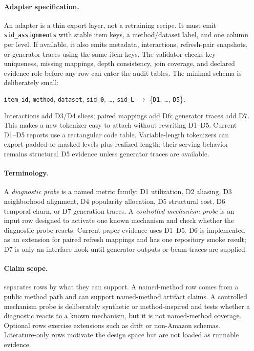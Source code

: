 \paragraph{Adapter specification.}
An adapter is a thin export layer, not a retraining recipe. It must emit
\texttt{sid\_assignments} with stable item keys, a method/dataset label, and
one column per \sid level. If available, it also emits metadata, interactions,
refresh-pair snapshots, or generator traces using the same item keys. The
validator checks key uniqueness, missing mappings, depth consistency, join
coverage, and declared evidence role before any row can enter the audit tables.
The minimal schema is deliberately small:
\begin{center}
\small
\texttt{item\_id}, \texttt{method}, \texttt{dataset}, \texttt{sid\_0}, \ldots,
\texttt{sid\_L} $\rightarrow$ \{\texttt{D1}, \ldots, \texttt{D5}\}.
\end{center}
Interactions add D3/D4 slices; paired mappings add D6; generator traces add
D7. This makes a new tokenizer easy to attach without rewriting D1--D5.
Current D1--D5 reports use a rectangular code table. Variable-length tokenizers
can export padded or masked levels plus realized length; their serving behavior
remains structural D5 evidence unless generator traces are available.

\paragraph{Terminology.}
A \emph{diagnostic probe} is a named metric family: D1 utilization, D2
aliasing, D3 neighborhood alignment, D4 popularity allocation, D5 structural
cost, D6 temporal churn, or D7 generation traces. A \emph{controlled mechanism
probe} is an input row designed to activate one known mechanism and check
whether the diagnostic probe reacts. Current paper evidence uses D1--D5. D6 is
implemented as an extension for paired refresh mappings and has one repository
smoke result; D7 is only an interface hook until generator outputs or beam
traces are supplied.

\paragraph{Claim scope.}
\tool separates rows by what they can support. A named-method row comes from a
public method path and can support named-method artifact claims. A controlled
mechanism probe is deliberately synthetic or method-inspired and tests whether
a diagnostic reacts to a known mechanism, but it is not named-method coverage.
Optional rows exercise extensions such as drift or non-Amazon schemas.
Literature-only rows motivate the design space but are not loaded as runnable
evidence.

